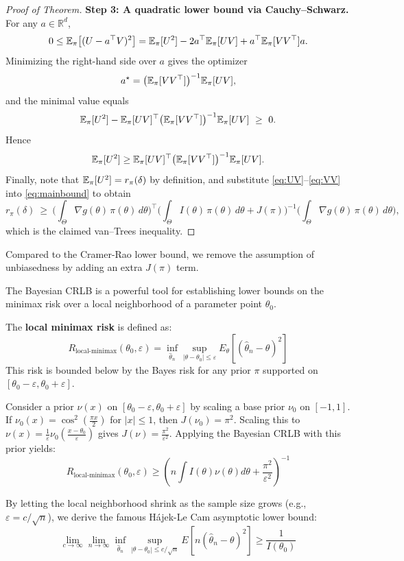 \begin{proof}[Proof of Theorem]
\textbf{Step 3: A quadratic lower bound via Cauchy--Schwarz.}
For any $a\in\mathbb{R}^d$,
\[
0 \le \mathbb{E}_\pi\big[(U-a^\top V)^2\big]
= \mathbb{E}_\pi[U^2] - 2a^\top \mathbb{E}_\pi[UV] + a^\top \mathbb{E}_\pi[VV^\top]a.
\]
Minimizing the right-hand side over $a$ gives the optimizer
\[
a^\star = \big(\mathbb{E}_\pi[VV^\top]\big)^{-1}\mathbb{E}_\pi[UV],
\]
and the minimal value equals
\[
\E_\pi[U^2] - \E_\pi[UV]^\top\big(\E_\pi[VV^\top]\big)^{-1}\E_\pi[UV]\ \ge\ 0.
\]
Hence
\begin{equation}\label{eq:mainbound}
\mathbb{E}_\pi[U^2] \ge \mathbb{E}_\pi[UV]^\top\big(\mathbb{E}_\pi[VV^\top]\big)^{-1}\mathbb{E}_\pi[UV].
\end{equation}
Finally, note that $\mathbb{E}_\pi[U^2]=r_\pi(\delta)$ by definition, and substitute
\eqref{eq:UV}--\eqref{eq:VV} into \eqref{eq:mainbound} to obtain
\[
r_\pi(\delta)\ \ge\
\Big(\int_\Theta \nabla g(\theta)\,\pi(\theta)\,d\theta\Big)^{\!\top}
\Big(\int_\Theta I(\theta)\,\pi(\theta)\,d\theta + J(\pi)\Big)^{-1}
\Big(\int_\Theta \nabla g(\theta)\,\pi(\theta)\,d\theta\Big),
\]
which is the claimed van--Trees inequality.
\end{proof}
\begin{remark}
    Compared to the Cramer-Rao lower bound, we remove the assumption of unbiasedness by adding an extra $J(\pi)$ term.
\end{remark}


The Bayesian CRLB is a powerful tool for establishing lower bounds on the minimax risk over a local neighborhood of a parameter point $\theta_0$. 
\begin{eg}
    The \textbf{local minimax risk} is defined as:
\[
R_{\text{local-minimax}}(\theta_0, \varepsilon) = \inf_{\hat{\theta}_n} \sup_{|\theta - \theta_0| \leq \varepsilon} E_{\theta}[(\hat{\theta}_n - \theta)^2]
\]
This risk is bounded below by the Bayes risk for any prior $\pi$ supported on $[\theta_0 - \varepsilon, \theta_0 + \varepsilon]$.

Consider a prior $\nu(x)$ on $[\theta_0 - \varepsilon, \theta_0 + \varepsilon]$ by scaling a base prior $\nu_0$ on $[-1, 1]$. If $\nu_0(x) = \cos^2(\frac{\pi x}{2})$ for $|x| \leq 1$, then $J(\nu_0) = \pi^2$. Scaling this to $\nu(x) = \frac{1}{\varepsilon} \nu_0\left(\frac{x - \theta_0}{\varepsilon}\right)$ gives $J(\nu) = \frac{\pi^2}{\varepsilon^2}$. Applying the Bayesian CRLB with this prior yields:
\[
R_{\text{local-minimax}}(\theta_0, \varepsilon) \geq \left( n \int I(\theta) \nu(\theta) d\theta + \frac{\pi^2}{\varepsilon^2} \right)^{-1}
\]
\end{eg}
\begin{cor}
    By letting the local neighborhood shrink as the sample size grows (e.g., $\varepsilon = c/\sqrt{n}$), we derive the famous Hájek-Le Cam asymptotic lower bound:
\[
\lim_{c \to \infty} \lim_{n \to \infty} \inf_{\hat{\theta}_n} \sup_{|\theta - \theta_0| \leq c/\sqrt{n}} E[n(\hat{\theta}_n - \theta)^2] \geq \frac{1}{I(\theta_0)}
\]
\end{cor}

